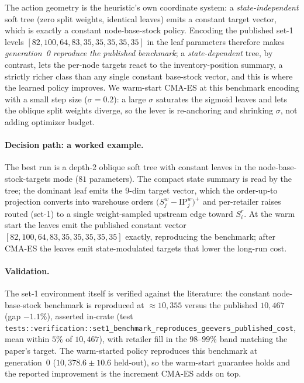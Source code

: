The action geometry is the heuristic's own coordinate system: a \emph{state-independent} soft tree
(zero split weights, identical leaves) emits a constant target vector, which is exactly a constant
node-base-stock policy. Encoding the published set-1 levels $[82,100,64,83,35,35,35,35,35]$ in the
leaf parameters therefore makes \emph{generation~0 reproduce the published benchmark}; a
\emph{state-dependent} tree, by contrast, lets the per-node targets react to the inventory-position
summary, a strictly richer class than any single constant base-stock vector, and this is where the
learned policy improves. We warm-start CMA-ES at this benchmark encoding with a small step size
($\sigma=0.2$): a large $\sigma$ saturates the sigmoid leaves and lets the oblique split weights
diverge, so the lever is re-anchoring and shrinking $\sigma$, not adding optimizer budget.

\paragraph{Decision path: a worked example.}
The best run is a depth-2 oblique soft tree with constant leaves in the node-base-stock-targets mode
($81$ parameters). The compact state summary is read by the tree; the dominant leaf emits the $9$-dim
target vector, which the order-up-to projection converts into warehouse orders
$\big(S^w_j-\mathrm{IP}^w_j\big)^+$ and per-retailer raises routed (set-1) to a single weight-sampled
upstream edge toward $S^r_i$. At the warm start the leaves emit the published constant vector
$[82,100,64,83,35,35,35,35,35]$ exactly, reproducing the benchmark; after CMA-ES the leaves emit
state-modulated targets that lower the long-run cost.

\paragraph{Validation.}
The set-1 environment itself is verified against the literature: the constant node-base-stock
benchmark is reproduced at $\approx 10{,}355$ versus the published $10{,}467$ (gap $-1.1\%$), asserted
in-crate (test \texttt{tests::verification::}\discretionary{}{}{}\texttt{set1\_benchmark\_reproduces\_}\discretionary{}{}{}\texttt{geevers\_published\_cost}, mean
within $5\%$ of $10{,}467$), with retailer fill in the $98$--$99\%$ band matching the paper's target.
The warm-started policy reproduces this benchmark at generation~0 ($10{,}378.6\pm10.6$ held-out), so
the warm-start guarantee holds and the reported improvement is the increment CMA-ES adds on top.

